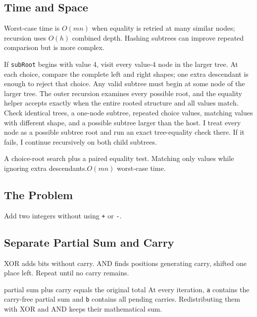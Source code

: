 \subsection{Time and Space}
Worst-case time is \(O(mn)\) when equality is retried at many similar nodes;
recursion uses \(O(h)\) combined depth. Hashing subtrees can improve repeated
comparison but is more complex.

\lessonexpansion
  {If \texttt{subRoot} begins with value 4, visit every value-4 node in the
   larger tree. At each choice, compare the complete left and right shapes;
   one extra descendant is enough to reject that choice.}
  {Any valid subtree must begin at some node of the larger tree. The outer
   recursion examines every possible root, and the equality helper accepts
   exactly when the entire rooted structure and all values match.}
  {Check identical trees, a one-node subtree, repeated choice values,
   matching values with different shape, and a possible subtree larger than the host.}
  {I treat every node as a possible subtree root and run an exact tree-equality
   check there. If it fails, I continue recursively on both child subtrees.}

  {A choice-root search plus a paired equality test.}
  {Matching only values while ignoring extra descendants.}{$O(mn)$ worst-case time.}



\subsection{The Problem}
Add two integers without using \texttt{+} or \texttt{-}.

\subsection{Separate Partial Sum and Carry}
XOR adds bits without carry. AND finds positions generating carry, shifted one
place left. Repeat until no carry remains.

\begin{invariantbox}{partial sum plus carry equals the original total}
At every iteration, \texttt{a} contains the carry-free partial sum and
\texttt{b} contains all pending carries. Redistributing them with XOR and AND
keeps their mathematical sum.
\end{invariantbox}

